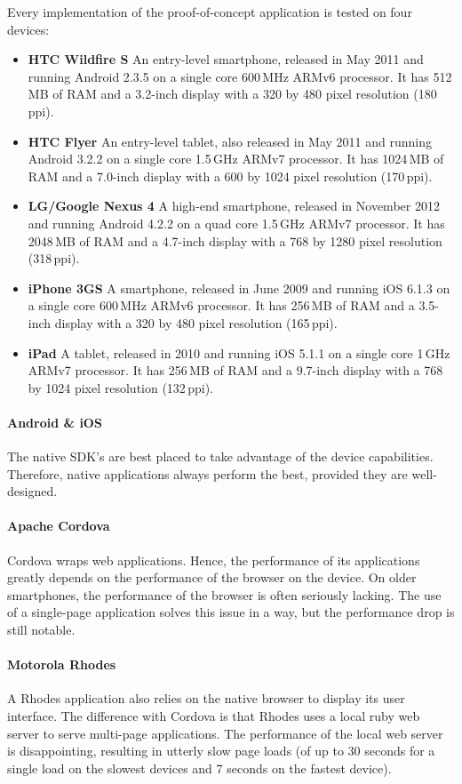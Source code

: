 Every implementation of the proof-of-concept application is tested on four devices:
\begin{itemize}
    \item \textbf{HTC Wildfire S} An entry-level smartphone, released in May 2011 and running Android 2.3.5 on a single core 600\,MHz ARMv6 processor. It has 512\,MB of RAM and a 3.2-inch display with a 320 by 480 pixel resolution (180\,ppi).
    \item \textbf{HTC Flyer} An entry-level tablet, also released in May 2011 and running Android 3.2.2 on a single core 1.5\,GHz ARMv7 processor. It has 1024\,MB of RAM and a 7.0-inch display with a 600 by 1024 pixel resolution (170\,ppi).
    \item \textbf{LG/Google Nexus 4} A high-end smartphone, released in November 2012 and running Android 4.2.2 on a quad core 1.5\,GHz ARMv7 processor. It has 2048\,MB of RAM and a 4.7-inch display with a 768 by 1280 pixel resolution (318\,ppi).
    \item \textbf{iPhone 3GS} A smartphone, released in June 2009 and running iOS 6.1.3 on a single core 600\,MHz ARMv6 processor. It has 256\,MB of RAM and a 3.5-inch display with a 320 by 480 pixel resolution (165\,ppi).
    \item \textbf{iPad} A tablet, released in 2010 and running iOS 5.1.1 on a single core 1\,GHz ARMv7 processor. It has 256\,MB of RAM and a 9.7-inch display with a 768 by 1024 pixel resolution (132\,ppi).
\end{itemize}

\paragraph{Android \& iOS} The native SDK's are best placed to take advantage of the device capabilities. Therefore, native applications always perform the best, provided they are well-designed.

\paragraph{Apache Cordova} Cordova wraps web applications. Hence, the performance of its applications greatly depends on the performance of the browser on the device. On older smartphones, the performance of the browser is often seriously lacking. The use of a single-page application solves this issue in a way, but the performance drop is still notable.

\paragraph{Motorola Rhodes} A Rhodes application also relies on the native browser to display its user interface. The difference with Cordova is that Rhodes uses a local ruby web server to serve multi-page applications. The performance of the local web server is disappointing, resulting in utterly slow page loads (of up to 30 seconds for a single load on the slowest devices and 7 seconds on the fastest device).

